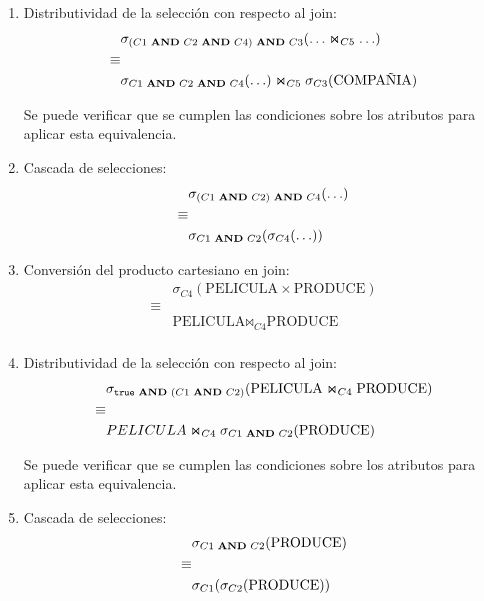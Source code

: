 \documentclass[10pt]{article}
\begin{document}
\begin{enumerate}
\begin{enumerate}
\item Distributividad de la selección con respecto al join:
       \begin{eqnarray*}
       & \sigma_{(C1 \text{ {\bf AND} } C2 \text{ {\bf AND} } C4) \text{ {\bf AND} } C3}(\ldots \Join_{C5} \ldots)  \\
       \equiv & \\
       & \sigma_{C1 \text{ {\bf AND} } C2 \text{ {\bf AND} } C4}(\ldots) \Join_{C5} \sigma_{C3}(\text{COMPAÑIA})  \\
       \end{eqnarray*}

       Se puede verificar que se cumplen las condiciones sobre los atributos
       para aplicar esta equivalencia.

 \item Cascada de selecciones:
       \begin{eqnarray*}
       & \sigma_{(C1 \text{ {\bf AND} } C2) \text{ {\bf AND} } C4}(\ldots) \\
       \equiv & \\
       & \sigma_{C1 \text{ {\bf AND} } C2}(\sigma_{C4}(\ldots))
       \end{eqnarray*}

 \item Conversión del producto cartesiano en join:
       \begin{eqnarray*}
       & \sigma_{C4}(\text{PELICULA} \times \text{PRODUCE}) \\
       \equiv & \\
       & \text{PELICULA} \Join_{C4} \text{PRODUCE} \\
       \end{eqnarray*}

\item Distributividad de la selección con respecto al join:
       \begin{eqnarray*}
       & \sigma_{\mathtt{true} \text{ {\bf AND} } (C1 \text{ {\bf AND} } C2)}(\text{PELICULA} \Join_{C4} \text{PRODUCE})  \\
       \equiv & \\
       & PELICULA \Join_{C4} \sigma_{C1 \text{ {\bf AND} } C2}(\text{PRODUCE})  \\
       \end{eqnarray*}

       Se puede verificar que se cumplen las condiciones sobre los atributos
       para aplicar esta equivalencia.

 \item Cascada de selecciones:
       \begin{eqnarray*}
       & \sigma_{C1 \text{ {\bf AND} } C2}(\text{PRODUCE}) \\
       \equiv & \\
       & \sigma_{C1}(\sigma_{C2}(\text{PRODUCE}))
       \end{eqnarray*}


\end{enumerate}
\end{enumerate}
\end{document}
